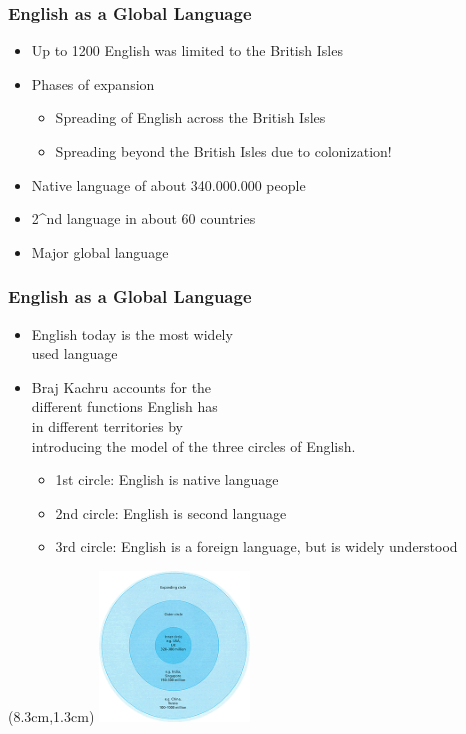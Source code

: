 \documentclass[12pt, table]{beamer}
\begin{document}
\begin{frame}
\frametitle{English as a Global Language}
\begin{itemize}
\item Up to 1200 English was limited to the British Isles 
\item Phases of expansion	
\begin{itemize}
\item Spreading of English across the British Isles
\item Spreading beyond the British Isles due to colonization!
\end{itemize}
\item Native language of about 340.000.000 people 
\item 2^{nd} language in about 60 countries
\item Major global language
\end{itemize}
\end{frame}

\begin{frame}
\frametitle{English as a Global Language}
\begin{itemize}
\item English today is the most widely \\ used language
\item Braj Kachru accounts for the \\ different functions English has \\ in different territories by \\ introducing the model of the three circles of English.
\begin{itemize}
\item 1st circle: English is native language
\item 2nd circle: English is second language
\item 3rd circle: English is a foreign language, but is widely understood
\end{itemize}
\end{itemize}
\begin{textblock*}{10cm}(8.3cm,1.3cm)
\includegraphics[width=4cm]{images/kachrucircle.png}
\end{textblock*}
\end{frame}
\end{document}
